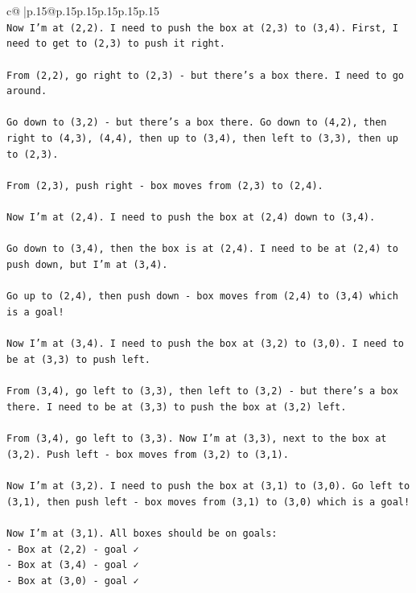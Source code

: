 \documentclass{article}
\begin{document}
{\begin{supertabular}{c@{$\;$}|p{.15\linewidth}@{}p{.15\linewidth}p{.15\linewidth}p{.15\linewidth}p{.15\linewidth}p{.15\linewidth}}
{{{\\ 
\texttt{Now I'm at (2,2). I need to push the box at (2,3) to (3,4). First, I need to get to (2,3) to push it right.} \\
\\ 
\texttt{From (2,2), go right to (2,3) {-} but there's a box there. I need to go around.} \\
\\ 
\texttt{Go down to (3,2) {-} but there's a box there. Go down to (4,2), then right to (4,3), (4,4), then up to (3,4), then left to (3,3), then up to (2,3).} \\
\\ 
\texttt{From (2,3), push right {-} box moves from (2,3) to (2,4).} \\
\\ 
\texttt{Now I'm at (2,4). I need to push the box at (2,4) down to (3,4).} \\
\\ 
\texttt{Go down to (3,4), then the box is at (2,4). I need to be at (2,4) to push down, but I'm at (3,4). } \\
\\ 
\texttt{Go up to (2,4), then push down {-} box moves from (2,4) to (3,4) which is a goal!} \\
\\ 
\texttt{Now I'm at (3,4). I need to push the box at (3,2) to (3,0). I need to be at (3,3) to push left.} \\
\\ 
\texttt{From (3,4), go left to (3,3), then left to (3,2) {-} but there's a box there. I need to be at (3,3) to push the box at (3,2) left.} \\
\\ 
\texttt{From (3,4), go left to (3,3). Now I'm at (3,3), next to the box at (3,2). Push left {-} box moves from (3,2) to (3,1).} \\
\\ 
\texttt{Now I'm at (3,2). I need to push the box at (3,1) to (3,0). Go left to (3,1), then push left {-} box moves from (3,1) to (3,0) which is a goal!} \\
\\ 
\texttt{Now I'm at (3,1). All boxes should be on goals:} \\
\texttt{{-} Box at (2,2) {-} goal ✓} \\
\texttt{{-} Box at (3,4) {-} goal ✓} \\
\texttt{{-} Box at (3,0) {-} goal ✓} \\
\\ 
}}}
\end{supertabular}}
\end{document}
